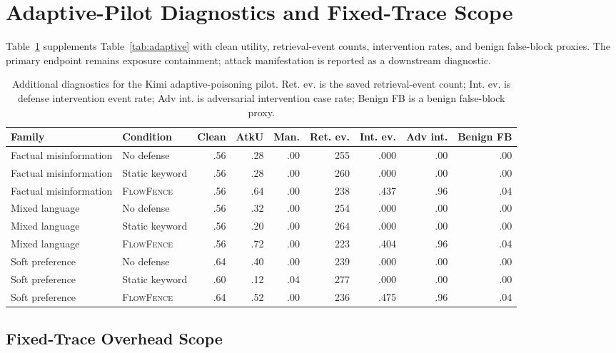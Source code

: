 \documentclass[11pt]{article}
\newcommand{\ff}{\textsc{FlowFence}\xspace}
\begin{document}
\section{Adaptive-Pilot Diagnostics and Fixed-Trace Scope}
\label{app:adaptive-diagnostics}

Table~\ref{tab:app-adaptive-diagnostics} supplements Table~\ref{tab:adaptive} with clean utility, retrieval-event counts, intervention rates, and benign false-block proxies. The primary endpoint remains exposure containment; attack manifestation is reported as a downstream diagnostic.

\begin{table}[t]
\centering
\footnotesize
\setlength{\tabcolsep}{3pt}
\begin{tabular}{llrrrrrrr}
\toprule
\textbf{Family} & \textbf{Condition} & \textbf{Clean} & \textbf{AtkU} & \textbf{Man.} & \textbf{Ret. ev.} & \textbf{Int. ev.} & \textbf{Adv int.} & \textbf{Benign FB} \\
\midrule
Factual misinformation & No defense & .56 & .28 & .00 & 255 & .000 & .00 & .00 \\
Factual misinformation & Static keyword & .56 & .28 & .00 & 260 & .000 & .00 & .00 \\
Factual misinformation & \ff & .56 & .64 & .00 & 238 & .437 & .96 & .04 \\
\midrule
Mixed language & No defense & .56 & .32 & .00 & 254 & .000 & .00 & .00 \\
Mixed language & Static keyword & .56 & .20 & .00 & 264 & .000 & .00 & .00 \\
Mixed language & \ff & .56 & .72 & .00 & 223 & .404 & .96 & .04 \\
\midrule
Soft preference & No defense & .64 & .40 & .00 & 239 & .000 & .00 & .00 \\
Soft preference & Static keyword & .60 & .12 & .04 & 277 & .000 & .00 & .00 \\
Soft preference & \ff & .64 & .52 & .00 & 236 & .475 & .96 & .04 \\
\bottomrule
\end{tabular}
\caption{Additional diagnostics for the Kimi adaptive-poisoning pilot. Ret. ev. is the saved retrieval-event count; Int. ev. is defense intervention event rate; Adv int. is adversarial intervention case rate; Benign FB is a benign false-block proxy.}
\label{tab:app-adaptive-diagnostics}
\end{table}

\subsection{Fixed-Trace Overhead Scope}
\label{app:fixed-trace-scope}
\end{document}
